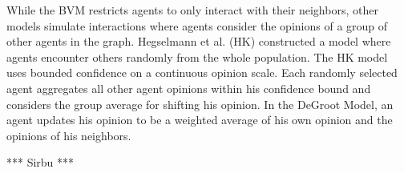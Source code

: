 While the BVM restricts agents to only interact with their neighbors, other models
simulate interactions where agents consider the opinions of a group of other agents 
in the graph. Hegselmann et al. (HK) constructed a model where agents encounter others
randomly from the whole population. The HK model uses bounded confidence on a continuous
opinion scale. Each randomly selected agent aggregates all other agent opinions within
his confidence bound and considers the group average for shifting his opinion. In the 
DeGroot Model, an agent updates his opinion to be a weighted average of his own opinion 
and the opinions of his neighbors.
 
*** Sirbu ***










